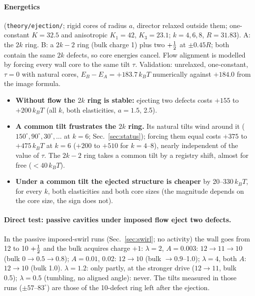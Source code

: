 \paragraph{Energetics} (\texttt{theory/ejection/}; rigid cores of radius $a$, director relaxed outside them; one-constant $K=32.5$ and anisotropic $K_1=42$,
$K_3=23.1$; $k=4,6,8$, $R=31.83$). A: the $2k$ ring. B: a $2k-2$ ring (bulk charge 1) plus two $+\tfrac12$ at $\pm0.45R$; both contain the same $2k$ defects, so core
energies cancel. Flow alignment is modelled by forcing every wall core to the same tilt $\tau$. Validation: unrelaxed, one-constant, $\tau=0$ with natural cores,
$E_B-E_A=+183.7\,k_BT$ numerically against $+184.0$ from the image formula.
\begin{itemize}
  \item \textbf{Without flow the $2k$ ring is stable:} ejecting two defects costs $+155$ to $+200\,k_BT$ (all $k$, both elasticities, $a=1.5$, 2.5).
  \item \textbf{A common tilt frustrates the $2k$ ring.} Its natural tilts wind around it ($150^\circ,90^\circ,30^\circ,\dots$ at $k=6$; Sec.~\ref{sec:status}); forcing them
        equal costs $+375$ to $+475\,k_BT$ at $k=6$ ($+200$ to $+510$ for $k=4$--8), nearly independent of the value of $\tau$. The $2k-2$ ring takes a common tilt by a registry shift, almost for free
        ($<40\,k_BT$).
  \item \textbf{Under a common tilt the ejected structure is cheaper} by 20--330\,$k_BT$, for every $k$, both elasticities and both core sizes (the magnitude depends on
        the core size, the sign does not).
\end{itemize}
\paragraph{Direct test: passive cavities under imposed flow eject two defects.} In the passive imposed-swirl runs (Sec.~\ref{sec:swirl}; no activity) the wall goes
from 12 to 10 $+\tfrac12$ and the bulk acquires charge $+1$: $\lambda=2$, $A=0.003$: $12\to11\to10$ (bulk $0\to0.5\to0.8$); $A=0.01$, 0.02: $12\to10$ (bulk $\to0.9$--1.0);
$\lambda=4$, both $A$: $12\to10$ (bulk 1.0). $\lambda=1.2$: only partly, at the stronger drive ($12\to11$, bulk 0.5); $\lambda=0.5$ (tumbling, no aligned angle): never.
The tilts measured in those runs ($\pm57$--$83^\circ$) are those of the 10-defect ring left after the ejection.
